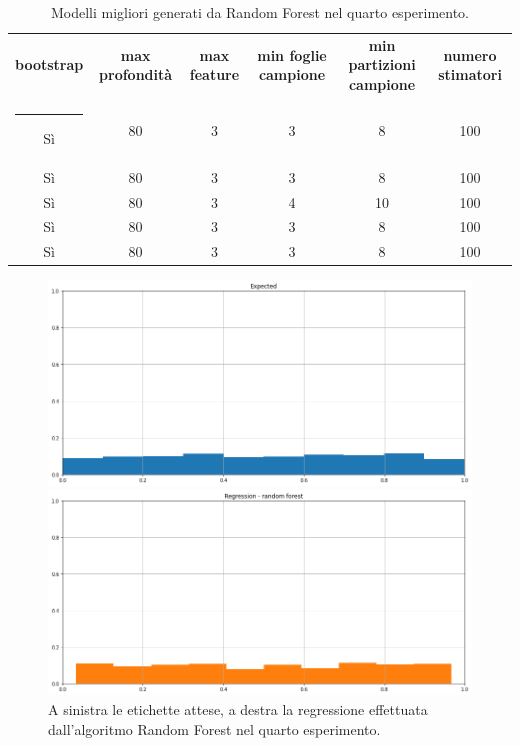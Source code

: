 \documentclass[12pt]{report}
\makeatletter
\theoremstyle{definition}
\newcommand{\thickhline}{%
    \noalign {\ifnum 0=`}\fi \hrule height 1pt
    \futurelet \reserved@a \@xhline
}
\makeatother
\begin{document}
\begin{table}
\centering
\begin{adjustbox}{max width=\textwidth}
 \begin{tabular}{|c|c|c|c|c|c|} 
 \hline
\textbf{bootstrap} & \textbf{max profondità} & \textbf{max feature} & \textbf{min foglie campione} & \textbf{min partizioni campione} & \textbf{numero stimatori}
\\ [0.5ex] 
 \thickhline
 Sì & 80 & 3 & 3 & 8 & 100 \\ 
 Sì & 80 & 3 & 3 & 8 & 100 \\ 
 Sì & 80 & 3 & 4 & 10 & 100 \\ 
 Sì & 80 & 3 & 3 & 8 & 100 \\ 
 Sì & 80 & 3 & 3 & 8 & 100 \\ 
 \hline
\end{tabular}
\end{adjustbox}
\caption{Modelli migliori generati da Random Forest nel quarto esperimento.}
\label{models_rf_exp4}
\end{table}

\begin{figure}
\centering
    \begin{minipage}{0.48\textwidth}
        \includegraphics[width=\linewidth]{images/experiment_uniform_sovrapposti/expected_memberships.png}
    \end{minipage}
    \begin{minipage}{0.48\textwidth}
        \includegraphics[width=\linewidth]{images/experiment_uniform_sovrapposti/prediction_regression_rf.png}
    \end{minipage}
    \caption{A sinistra le etichette attese, a destra la regressione effettuata dall'algoritmo Random Forest nel quarto esperimento.}
    \label{rf_exp4}
\end{figure} 
\end{document}
